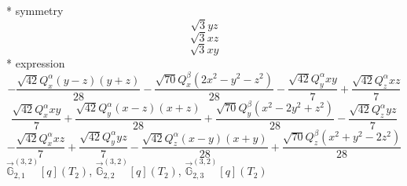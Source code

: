 \documentclass[fleqn,8pt]{jsarticle}
\begin{document}
\noindent\quad ** symmetry
\begin{dmath*}
\sqrt{3} y z
\end{dmath*}
\begin{dmath*}
\sqrt{3} x z
\end{dmath*}
\begin{dmath*}
\sqrt{3} x y
\end{dmath*}
\noindent\quad ** expression
\begin{dmath*}
- \frac{\sqrt{42} Q_{x}^{\alpha} \left(y - z\right) \left(y + z\right)}{28} - \frac{\sqrt{70} Q_{x}^{\beta} \left(2 x^{2} - y^{2} - z^{2}\right)}{28} - \frac{\sqrt{42} Q_{y}^{\alpha} x y}{7} + \frac{\sqrt{42} Q_{z}^{\alpha} x z}{7}
\end{dmath*}
\begin{dmath*}
\frac{\sqrt{42} Q_{x}^{\alpha} x y}{7} + \frac{\sqrt{42} Q_{y}^{\alpha} \left(x - z\right) \left(x + z\right)}{28} + \frac{\sqrt{70} Q_{y}^{\beta} \left(x^{2} - 2 y^{2} + z^{2}\right)}{28} - \frac{\sqrt{42} Q_{z}^{\alpha} y z}{7}
\end{dmath*}
\begin{dmath*}
- \frac{\sqrt{42} Q_{x}^{\alpha} x z}{7} + \frac{\sqrt{42} Q_{y}^{\alpha} y z}{7} - \frac{\sqrt{42} Q_{z}^{\alpha} \left(x - y\right) \left(x + y\right)}{28} + \frac{\sqrt{70} Q_{z}^{\beta} \left(x^{2} + y^{2} - 2 z^{2}\right)}{28}
\end{dmath*}
\noindent\quad $\vec{\mathbb{G}}_{2,1}^{(3,2)}[q](T_{2})$, $\vec{\mathbb{G}}_{2,2}^{(3,2)}[q](T_{2})$, $\vec{\mathbb{G}}_{2,3}^{(3,2)}[q](T_{2})$
\end{document}
